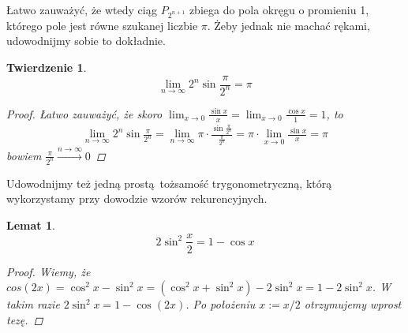 \documentclass[10pt,wide]{mwart}
\newtheorem{lemat}{Lemat}
\newtheorem{tw}{Twierdzenie}
\theoremstyle{definition}
\begin{document}
Łatwo zauważyć, że wtedy ciąg \(P_{2^{n+1}}\) zbiega do pola okręgu o promieniu 1, którego pole jest równe szukanej liczbie \(\pi\).
Żeby jednak nie machać rękami, udowodnijmy sobie to dokładnie.
\newpage
 \begin{tw}
   \begin{equation*}
   \lim_{n\to\infty} 2^{n}\sin{\frac{\pi}{2^n}} = \pi
 \end{equation*}
   \begin{proof}
    Łatwo zauważyć, że skoro \(\lim_{x\to 0} \frac{\sin{x}}{x} = \lim_{x \to 0} \frac{\cos{x}}{1} = 1\), to
    \begin{equation*}
    \begin{split}
    \lim_{n\to\infty} 2^{n}\sin{\frac{\pi}{2^n}} = \lim_{n\to\infty} \pi \cdot \frac{\sin{\frac{\pi}{2^n}}}{\frac{\pi}{2^{n}}} = \pi \cdot \lim_{x\to 0} \frac{\sin{x}}{x} = \pi
    \end{split}
    \end{equation*}
    bowiem \(\frac{\pi}{2^n} \stackrel{n\to\infty}{\to} 0\)
   \end{proof}
 \end{tw}
 Udowodnijmy też jedną prostą tożsamość trygonometryczną, którą wykorzystamy przy dowodzie wzorów rekurencyjnych.
 \begin{lemat}
   \begin{equation*}
   2\sin^2{\frac{x}{2}} = 1 - \cos{x}
 \end{equation*}
 \begin{proof}
   Wiemy, że \(cos(2x) = \cos^2{x} - \sin^2{x} = (\cos^2{x} + \sin^2{x}) - 2\sin^2{x} = 1 - 2\sin^2{x} \). W takim razie \(2\sin^2{x} = 1 - \cos(2x)\). Po położeniu \(x := x/2\) otrzymujemy wprost tezę.
\end{proof}
\end{lemat}
\end{document}
